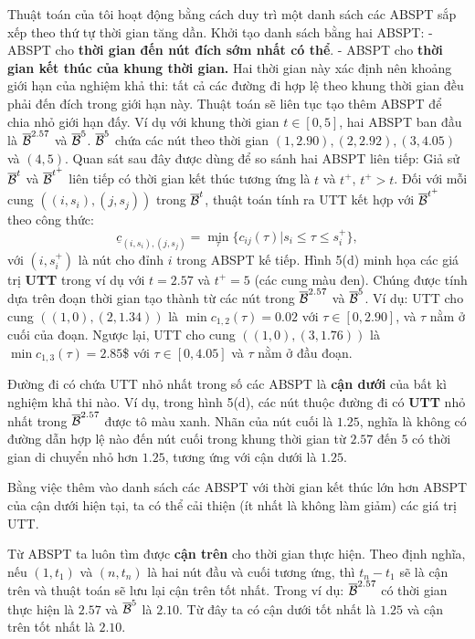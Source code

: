 \documentclass[14pt,oneside]{scrbook}
\begin{document}
Thuật toán của tôi hoạt động bằng cách duy trì một danh sách các ABSPT
sắp xếp theo thứ tự thời gian tăng dần. Khởi tạo danh sách bằng hai
ABSPT: - ABSPT cho \textbf{thời gian đến nút đích sớm nhất có thể}. -
ABSPT cho \textbf{thời gian kết thúc của khung thời gian.} Hai thời gian
này xác định nên khoảng giới hạn của nghiệm khả thi: tất cả các đường đi
hợp lệ theo khung thời gian đều phải đến đích trong giới hạn này. Thuật
toán sẽ liên tục tạo thêm ABSPT để chia nhỏ giới hạn đấy. Ví dụ với
khung thời gian \(t\in [0,5]\), hai ABSPT ban đầu là
\(\overline{\cal B}^{2.57}\) và \(\overline{\cal B}^{5}\).
\(\overline{\cal B}^{5}\) chứa các nút theo thời gian
\((1, 2.90), (2, 2.92), (3, 4.05)\) và \((4, 5)\). Quan sát sau đây được
dùng để so sánh hai ABSPT liên tiếp: Giả sử \(\overline{\cal B}^t\) và
\(\overline{\cal B}^{t^+}\) liên tiếp có thời gian kết thúc tương ứng là
\(t\) và \(t^+\), \(t^+>t\). Đối với mỗi cung \(((i, s_i), (j, s_j))\)
trong \(\overline{\cal B}^t\), thuật toán tính ra UTT kết hợp với
\(\overline{\cal B}^{t^+}\) theo công thức:
\[    \underline c_{(i, s_i),(j, s_j)}=\min_\tau\{c_{ij}(\tau)|s_i\le\tau\le s_i^+\},\]
với \((i, s_i^+)\) là nút cho đỉnh \(i\) trong ABSPT kế tiếp. Hình 5(d)
minh họa các giá trị \textbf{UTT} trong ví dụ với \(t = 2.57\) và
\(t^+  = 5\) (các cung màu đen). Chúng được tính dựa trên đoạn thời gian
tạo thành từ các nút trong \(\overline{\cal B}^{2.57}\) và
\(\overline{\cal B}^{5}\). Ví dụ: UTT cho cung \(((1, 0),(2, 1.34))\) là
\(\min c_{1, 2}(\tau) = 0.02\) với \(\tau \in [0, 2.90]\), và \(\tau\)
nằm ở cuối của đoạn. Ngược lại, UTT cho cung \(((1, 0),(3, 1.76))\) là
\(\min c_{1,3}(\tau) = 2.85\)\$ với \(\tau \in [0, 4.05]\) và \(\tau\)
nằm ở đầu đoạn.

Đường đi có chứa UTT nhỏ nhất trong số các ABSPT là \textbf{cận dưới}
của bất kì nghiệm khả thi nào. Ví dụ, trong hình 5(d), các nút thuộc
đường đi có \textbf{UTT} nhỏ nhất trong \(\overline{\cal B}^{2.57}\)
được tô màu xanh. Nhãn của nút cuối là \(1.25\), nghĩa là không có đường
dẫn hợp lệ nào đến nút cuối trong khung thời gian từ \(2.57\) đến \(5\)
có thời gian di chuyển nhỏ hơn \(1.25\), tương ứng với cận dưới là
\(1.25\).

Bằng việc thêm vào danh sách các ABSPT với thời gian kết thúc lớn hơn
ABSPT của cận dưới hiện tại, ta có thể cải thiện (ít nhất là không làm
giảm) các giá trị UTT.

Từ ABSPT ta luôn tìm được \textbf{cận trên} cho thời gian thực hiện.
Theo định nghĩa, nếu \((1, t_1)\) và \((n, t_n)\) là hai nút đầu và cuối
tương ứng, thì \(t_n - t_1\) sẽ là cận trên và thuật toán sẽ lưu lại cận
trên tốt nhất. Trong ví dụ: \(\overline{\cal B}^{2.57}\) có thời gian
thực hiện là \(2.57\) và \(\overline{\cal B}^{5}\) là \(2.10\). Từ đây
ta có cận dưới tốt nhất là \(1.25\) và cận trên tốt nhất là \(2.10\).
\end{document}
